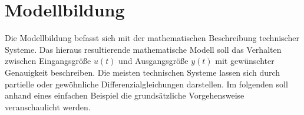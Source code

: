 \chapter{Modellbildung}
\label{chap:Modellbildung}
%
Die Modellbildung befasst sich mit der mathematischen Beschreibung technischer Systeme. Das hieraus resultierende mathematische Modell soll das Verhalten zwischen Eingangsgröße $u(t)$ und Ausgangsgröße $y(t)$ mit gewünschter Genauigkeit beschreiben. Die meisten technischen Systeme lassen sich durch partielle oder gewöhnliche Differenzialgleichungen darstellen. Im folgenden soll anhand eines einfachen Beispiel die grundsätzliche Vorgehensweise veranschaulicht werden. 
%
